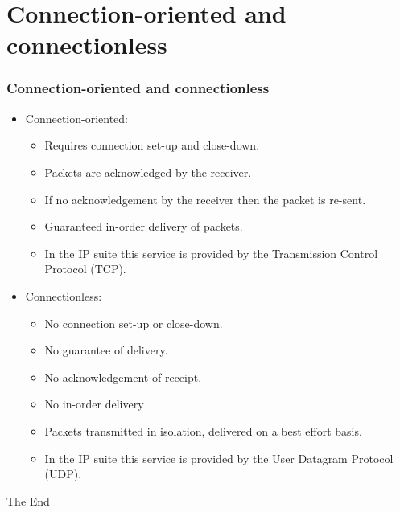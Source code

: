 \documentclass{beamer}
\begin{document}
\section{Connection-oriented and connectionless}
\begin{frame}
\frametitle{Connection-oriented and connectionless}
\begin{itemize}
\item {\color{red}Connection-oriented:}
\begin{itemize}
\item Requires connection set-up and close-down.
\item Packets are acknowledged by the receiver.
\item If no acknowledgement by the receiver then the packet is re-sent.
\item Guaranteed in-order delivery of packets.
\item In the IP suite this service is provided by the {\color{purple} Transmission Control Protocol} (TCP).
\end{itemize}
\item {\color{green}Connectionless:}
\begin{itemize}
\item No connection set-up or close-down.
\item No guarantee of delivery.
\item No acknowledgement of receipt.
\item No in-order delivery
\item Packets transmitted in isolation, delivered on a best effort basis.
\item In the IP suite this service is provided by the {\color{orange} User Datagram Protocol} (UDP).
\end{itemize}
\end{itemize}
\end{frame}
\begin{frame} 
\Huge{\centerline{The End}}
\end{frame}
\end{document}
